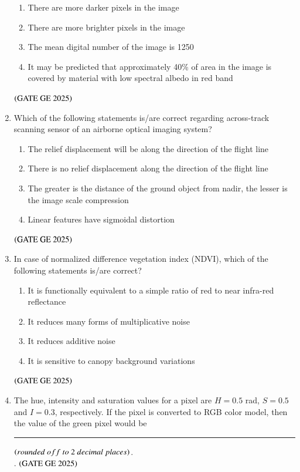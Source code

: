 \documentclass[journal,12pt,onecolumn]{IEEEtran}
\theoremstyle{remark}
\begin{document}
\begin{enumerate}
\begin{figure}[H]
    \caption{}
    \label{figs:fig14}
\end{figure}
\begin{enumerate}
\item There are more darker pixels in the image
\item There are more brighter pixels in the image
\item The mean digital number of the image is 1250
\item It may be predicted that approximately 40\% of area in the image is covered by material with low spectral albedo in red band
\end{enumerate}
\hfill $\left(\text{GATE GE 2025}\right)$
\bigskip
\item Which of the following statements is/are correct regarding across-track scanning sensor of an airborne optical imaging system?
\begin{enumerate}
\item The relief displacement will be along the direction of the flight line
\item There is no relief displacement along the direction of the flight line
\item The greater is the distance of the ground object from nadir, the lesser is the image scale compression
\item Linear features have sigmoidal distortion
\end{enumerate}
\hfill $\left(\text{GATE GE 2025}\right)$
\bigskip
\item In case of normalized difference vegetation index (NDVI), which of the following statements is/are correct?
\begin{enumerate}
\item It is functionally equivalent to a simple ratio of red to near infra-red reflectance
\item It reduces many forms of multiplicative noise
\item It reduces additive noise
\item It is sensitive to canopy background variations
\end{enumerate}
\hfill $\left(\text{GATE GE 2025}\right)$
\bigskip
\item The hue, intensity and saturation values for a pixel are $H = 0.5$ rad, $S = 0.5$ and $I = 0.3$, respectively. If the pixel is converted to RGB color model, then the value of the green pixel would be \rule{2cm}{0.5mm} $\brak{rounded\ off\ to\ 2\ decimal\ places}$.
\\.
\hfill $\left(\text{GATE GE 2025}\right)$

\end{enumerate}
\end{document}
